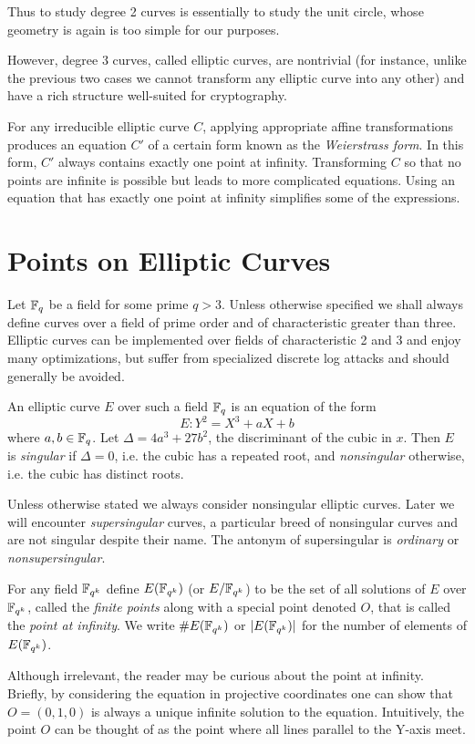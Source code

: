 Thus to study degree 2 curves is essentially to study the unit circle,
whose geometry is again is too simple for our purposes.

However, degree 3 curves, called elliptic curves,
are nontrivial (for instance, unlike the previous two
cases we cannot transform any elliptic curve into
any other)
and have a rich structure well-suited for cryptography.

For any irreducible elliptic curve $C$,
applying appropriate affine transformations
produces an equation $C'$ of a certain form known
as the \emph{Weierstrass form}.
In this form, $C'$ always contains exactly one point at infinity.
Transforming $C$ so
that no points are infinite is
possible but leads to more complicated
equations. Using an equation that has
exactly one point at infinity simplifies some of the expressions.

\section {Points on Elliptic Curves}

Let $\mathbb{F}_q$ be a field for some prime $q > 3$.
Unless otherwise specified we shall always
define curves over a field of prime order and of characteristic greater
than three.
Elliptic curves can be implemented over fields of characteristic 2 and 3
and enjoy many optimizations,
but suffer from specialized discrete log attacks and should generally
be avoided.

An elliptic curve $E$ over such a field $\mathbb{F}_q$ is an equation of the form
\[ E: Y^2 = X^3 + a X + b \]
where $a, b \in \mathbb{F}_q$.
Let $\Delta = 4 a^3 + 27b^2$, the discriminant of the cubic in $x$. Then
$E$ is \emph{singular} if $\Delta = 0$, i.e. the cubic has a repeated root,
and \emph{nonsingular} otherwise, i.e. the cubic has distinct roots.

Unless otherwise stated we always consider nonsingular elliptic curves.
Later we will encounter \emph{supersingular} curves, a particular
breed of nonsingular curves and are not singular despite their name.
The antonym of supersingular is \emph{ordinary} or \emph{nonsupersingular}.

For any field $\mathbb{F}_{q^k}$ define $E(\mathbb{F}_{q^k})$ (or $E/\mathbb{F}_{q^k}$)
to be the set of all solutions
of $E$ over $\mathbb{F}_{q^k}$, called the \emph{finite points}
along with a special point denoted $O$,
that is called the \emph{point at infinity}. We write $\#E(\mathbb{F}_{q^k})$ 
or $|E(\mathbb{F}_{q^k})|$ for
the number of elements of $E(\mathbb{F}_{q^k})$.

Although irrelevant, the reader may be curious about the point at infinity.
Briefly, by considering the equation in
projective coordinates one can show that $O = (0,1,0)$ is always a unique
infinite solution to the equation. Intuitively,
the point $O$ can be thought of as the point where all lines
parallel to the Y-axis meet.

